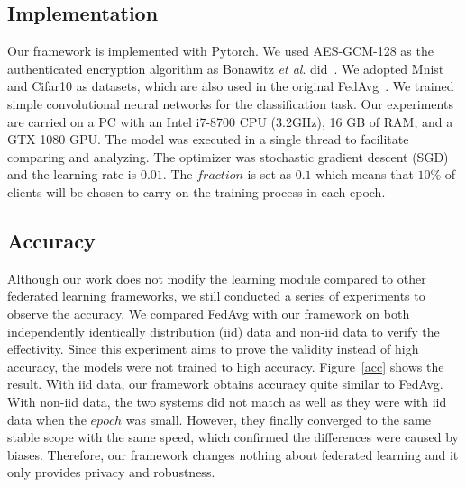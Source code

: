 \subsection{Implementation}
Our framework is implemented with Pytorch. We used AES-GCM-128 as the authenticated encryption algorithm as Bonawitz \emph{et al}. did~\cite{Practical}. We adopted Mnist and Cifar10 as datasets, which are also used in the original FedAvg~\cite{mcmahan2016communicationefficient}. We trained simple convolutional neural networks for the classification task. Our experiments are carried on a PC with an Intel i7-8700 CPU (3.2GHz), 16 GB of RAM, and a GTX 1080 GPU. The model was executed in a single thread to facilitate comparing and analyzing. The optimizer was stochastic gradient descent (SGD) and the learning rate is $0.01$. The $fraction$ is set as $0.1$ which means that $10\%$ of clients will be chosen to carry on the training process in each epoch. 


\subsection{Accuracy}
Although our work does not modify the learning module compared to other federated learning frameworks, we still conducted a series of experiments to observe the accuracy. We compared FedAvg with our framework on both independently identically distribution (iid) data and non-iid data to verify the effectivity. Since this experiment aims to prove the validity instead of high accuracy, the models were not trained to high accuracy. Figure~\ref{acc} shows the result. With iid data, our framework obtains accuracy quite similar to FedAvg. With non-iid data, the two systems did not match as well as they were with iid data when the $epoch$ was small. However, they finally converged to the same stable scope with the same speed, which confirmed the differences were caused by biases. Therefore, our framework changes nothing about federated learning and it only provides privacy and robustness. 

